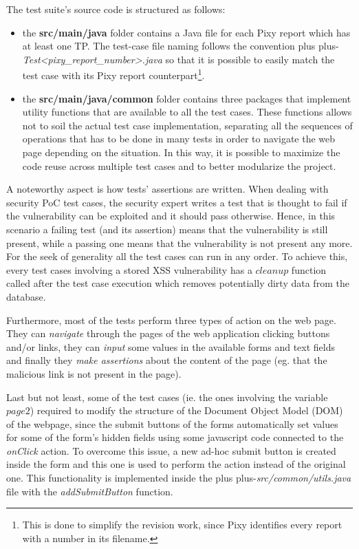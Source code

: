 \documentclass{sig-alternate-05-2015}
\newcommand\lword[1]{\leavevmode\nobreak\hskip0pt plus\linewidth\penalty50\hskip0pt plus-\linewidth\nobreak#1}
\begin{document}
The test suite's source code is structured as follows:
\begin{itemize}
    \item the \textbf{src/main/java} folder contains a Java file for each Pixy report which
        has at least one TP. The test-case file naming follows the convention
        \lword{\emph{Test<pixy\_report\_number>.java}} so that it is possible to easily match the test
        case with its Pixy report counterpart\footnote{This is done to simplify the revision work,
        since Pixy identifies every report with a number in its filename.}.
    \item the \textbf{src/main/java/common} folder contains three packages that implement
        utility functions that are available to all the test cases. These functions
        allows not to soil the actual test case implementation, separating all the
        sequences of operations that has to be done in many tests in order to navigate
        the web page depending on the situation. In this way, it is possible to maximize
        the code reuse across multiple test cases and to better modularize the project.
\end{itemize}
A noteworthy aspect is how tests' assertions are written. When dealing with
security PoC test cases, the security expert writes a test that is thought to fail
if the vulnerability can be exploited and it should pass otherwise. Hence, in this scenario
a failing test (and its assertion) means that the vulnerability is still present,
while a passing one means that the vulnerability is not present any more.
For the seek of generality all the test cases can run in any order. To achieve this,
every test cases involving a stored XSS vulnerability has a $cleanup$ function called
after the test case execution which removes potentially dirty data from the database.

Furthermore, most of the tests perform three types of action on the web page.
They can \emph{navigate} through the pages of the web application clicking buttons and/or links,
they can \emph{input} some values in the available forms and text fields and finally they
\emph{make assertions} about the content of the page (eg. that the malicious link is not
present in the page).

Last but not least, some of the test cases (ie. the ones involving the variable $page2$)
required to modify the structure of the Document Object Model (DOM) of the webpage, since
the submit buttons of the forms automatically set values for some of the form's hidden
fields using some javascript code connected to the \emph{onClick} action.
To overcome this issue, a new ad-hoc submit button is created inside the form
and this one is used to perform the action instead of the original one. This functionality
is implemented inside the \lword{\emph{src/common/utils.java}} file with the \emph{addSubmitButton}
function.
\end{document}
